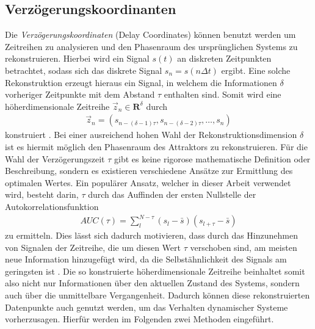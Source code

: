 \subsection{Verzögerungskoordinanten}
\label{sc:delay_reconstruction}
Die \textit{Verzögerungskoordinaten} (Delay Coordinates) können benutzt werden um Zeitreihen zu analysieren und den Phasenraum des ursprünglichen Systems zu rekonstruieren.
Hierbei wird ein Signal $s(t)$ an diskreten Zeitpunkten betrachtet, sodass sich das diskrete Signal $s_n = s(n\Delta t)$ ergibt. Eine solche Rekonstruktion erzeugt hieraus ein Signal, in welchem die Informationen $\delta$ vorheriger Zeitpunkte mit dem Abstand $\tau$ enthalten sind. Somit wird eine höherdimensionale Zeitreihe $\vec{z}_n \in \mathbf{R}^{\delta}$ durch
\begin{align}
	\vec{z}_n = \left(s_{n-(\delta-1)\tau}, s_{n-(\delta-2)\tau}, \ldots ,s_n \right)
\end{align} 
konstruiert \citep[35\,ff.]{kantz2004nonlinear}. Bei einer ausreichend hohen Wahl der Rekonstruktionsdimension $\delta$ ist es hiermit möglich den Phasenraum des Attraktors zu rekonstruieren. Für die Wahl der Verzögerungszeit $\tau$ gibt es keine rigorose mathematische Definition oder Beschreibung, sondern es existieren verschiedene Ansätze zur Ermittlung des optimalen Wertes. Ein populärer Ansatz, welcher in dieser Arbeit verwendet wird, besteht darin, $\tau$ durch das Auffinden der ersten Nullstelle der Autokorrelationsfunktion 
\begin{align}
AUC(\tau) = \sum_l^{N-\tau} (s_l-\bar{s})(s_{l+\tau}-\bar{s})
\end{align}   
zu ermitteln. Dies lässt sich dadurch motivieren, dass durch das Hinzunehmen von Signalen der Zeitreihe, die um diesen Wert $\tau$ verschoben sind, am meisten neue Information hinzugefügt wird, da die Selbstähnlichkeit des Signals am geringsten ist \citep[30\,ff.]{kantz2004nonlinear}.
Die so konstruierte höherdimensionale Zeitreihe beinhaltet somit also nicht nur Informationen über den aktuellen Zustand des Systems, sondern auch über die unmittelbare Vergangenheit. Dadurch können diese rekonstruierten Datenpunkte auch genutzt werden, um das Verhalten dynamischer Systeme vorherzusagen. Hierfür werden im Folgenden zwei Methoden eingeführt.